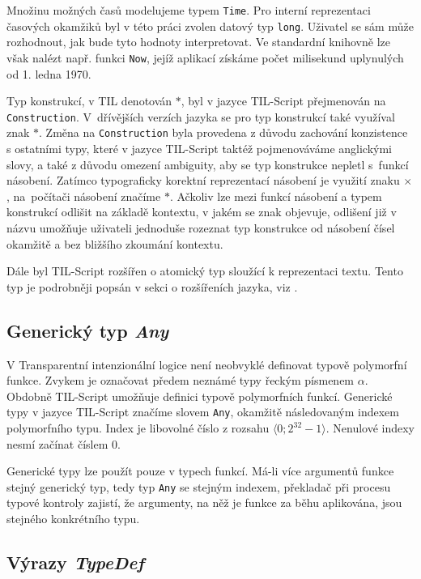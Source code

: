 Množinu možných časů modelujeme typem \lstinline{Time}. Pro interní reprezentaci časových okamžiků
byl v této práci zvolen datový typ \lstinline{long}. Uživatel se sám může rozhodnout, jak bude tyto
hodnoty interpretovat. Ve standardní knihovně lze však nalézt např. funkci \lstinline{Now}, jejíž
aplikací získáme počet milisekund uplynulých od 1. ledna 1970.

Typ konstrukcí, v TIL denotován $*$, byl v jazyce TIL-Script přejmenován
na \lstinline{Construction}. V~dřívějších verzích jazyka se pro typ konstrukcí také využíval znak
$*$\cite{vyletelek}. Změna na \lstinline{Construction} byla provedena z důvodu zachování konzistence
s ostatními typy, které v jazyce TIL-Script taktéž pojmenováváme anglickými slovy, a také z důvodu
omezení ambiguity, aby se typ konstrukce nepletl s~funkcí násobení. Zatímco typograficky korektní
reprezentací násobení je využití znaku $\times$, na~počítači násobení značíme $*$. Ačkoliv lze mezi
funkcí násobení a typem konstrukcí odlišit na základě kontextu, v jakém se znak objevuje, odlišení
již v názvu umožňuje uživateli jednoduše rozeznat typ konstrukce od násobení čísel okamžitě a
bez bližšího zkoumání kontextu.

Dále byl TIL-Script rozšířen o atomický typ sloužící k reprezentaci textu. Tento typ je podrobněji
popsán v sekci o rozšířeních jazyka, viz .

\subsection{Generický typ \textit{Any}}

V Transparentní intenzionální logice není neobvyklé definovat typově polymorfní funkce. Zvykem je
označovat předem neznámé typy řeckým písmenem $\alpha$. Obdobně TIL-Script umožňuje definici
typově polymorfních funkcí. Generické typy v jazyce TIL-Script značíme slovem \lstinline{Any},
okamžitě následovaným indexem polymorfního typu. Index je libovolné číslo z rozsahu
$\bigl \langle 0; 2^{32}-1 \bigr \rangle$. Nenulové indexy nesmí začínat číslem 0.

Generické typy lze použít pouze v typech funkcí. Má-li více argumentů funkce stejný generický
typ, tedy typ \lstinline{Any} se stejným indexem, překladač při procesu typové kontroly zajistí,
že argumenty, na něž je funkce za běhu aplikována, jsou stejného konkrétního typu.

\subsection{Výrazy \textit{TypeDef}}

